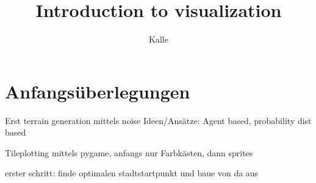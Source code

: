 \documentclass{scrartcl}
\title{Introduction to visualization}
\author{Kalle}
\begin{document}
\maketitle
\tableofcontents
\newpage

\section{Anfangsüberlegungen}
Erst terrain generation mittels noise
Ideen/Ansätze: Agent based, probability dist based

Tileplotting mittels pygame, anfangs nur Farbkästen, dann sprites

erster schritt: finde optimalen stadtstartpunkt und baue von da aus
\end{document}

